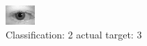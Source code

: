 \begin{figure}[h!]
\begin{center}
\includegraphics[width=0.60\columnwidth]{figures/ID563_class_2_target_3.png}
\end{center}
\caption{ Classification: 2 actual target: 3}
\label{fig:ID563_class_2_target_3}
\end{figure}
